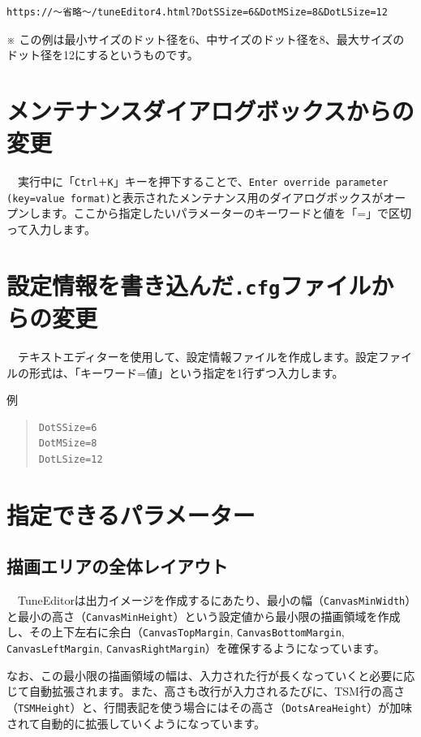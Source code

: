 \begin{verbatim}
https://〜省略〜/tuneEditor4.html?DotSSize=6&DotMSize=8&DotLSize=12
\end{verbatim}

※ この例は最小サイズのドット径を6、中サイズのドット径を8、最大サイズのドット径を12にするというものです。


\section{メンテナンスダイアログボックスからの変更}

　実行中に「\texttt{Ctrl＋K}」キーを押下することで、\texttt{Enter override parameter (key=value format)}と表示されたメンテナンス用のダイアログボックスがオープンします。ここから指定したいパラメーターのキーワードと値を「=」で区切って入力します。


\section{設定情報を書き込んだ\texttt{.cfg}ファイルからの変更}

　テキストエディターを使用して、設定情報ファイルを作成します。設定ファイルの形式は、「\textsf{キーワード}=\textsf{値}」という指定を1行ずつ入力します。

\textsf{例}
\begin{quote}
\begin{verbatim}
DotSSize=6
DotMSize=8
DotLSize=12
\end{verbatim}
\end{quote}


\section{指定できるパラメーター}\label{Parameters}

\subsection{描画エリアの全体レイアウト}

　TuneEditorは出力イメージを作成するにあたり、最小の幅（\texttt{CanvasMinWidth}）と最小の高さ（\texttt{CanvasMinHeight}）という設定値から\textsf{最小限の描画領域}を作成し、その上下左右に余白（\texttt{CanvasTopMargin}, \texttt{CanvasBottomMargin}, \texttt{CanvasLeftMargin}, \texttt{CanvasRightMargin}）を確保するようになっています。

なお、この最小限の描画領域の幅は、入力された行が長くなっていくと必要に応じて自動拡張されます。また、高さも改行が入力されるたびに、TSM行の高さ（\texttt{TSMHeight}）と、行間表記を使う場合にはその高さ（\texttt{DotsAreaHeight}）が加味されて自動的に拡張していくようになっています。

